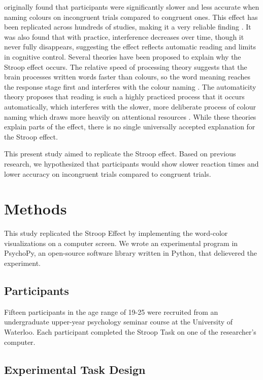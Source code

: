 \documentclass[
  authoryear,
  preprint]{elsarticle}
\begin{document}
\citet{Stroop1935} originally found that participants were significantly
slower and less accurate when naming colours on incongruent trials
compared to congruent ones. This effect has been replicated across
hundreds of studies, making it a very reliable finding
\citep{MacLeod1991}. It was also found that with practice, interference
decreases over time, though it never fully disappears, suggesting the
effect reflects automatic reading and limits in cognitive control.
Several theories have been proposed to explain why the Stroop effect
occurs. The relative speed of processing theory suggests that the brain
processes written words faster than colours, so the word meaning reaches
the response stage first and interferes with the colour naming
\citep{MacLeod1991}. The automaticity theory proposes that reading is
such a highly practiced process that it occurs automatically, which
interferes with the slower, more deliberate process of colour naming
which draws more heavily on attentional resources \citep{MacLeod1991}.
While these theories explain parts of the effect, there is no single
universally accepted explanation for the Stroop effect.

This present study aimed to replicate the Stroop effect. Based on
previous research, we hypothesized that participants would show slower
reaction times and lower accuracy on incongruent trials compared to
congruent trials.

\section{Methods}\label{methods}

This study replicated the Stroop Effect by implementing the word-color
visualizations on a computer screen. We wrote an experimental program in
PsychoPy, an open-source software library written in Python, that
delievered the experiment.

\subsection{Participants}\label{participants}

Fifteen participants in the age range of 19-25 were recruited from an
undergraduate upper-year psychology seminar course at the University of
Waterloo. Each participant completed the Stroop Task on one of the
researcher's computer.

\subsection{Experimental Task Design}\label{experimental-task-design}
\end{document}

